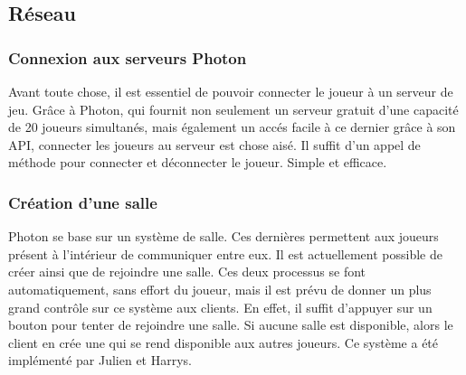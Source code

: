 \subsection{Réseau}

    \subsubsection{Connexion aux serveurs Photon}
        Avant toute chose, il est essentiel de pouvoir connecter le joueur à un serveur de jeu. Grâce à Photon, qui fournit non seulement un serveur gratuit d'une capacité de 20 joueurs simultanés, mais également un accés facile à ce dernier grâce à son API, connecter les joueurs au serveur est chose aisé. Il suffit d'un appel de méthode pour connecter et déconnecter le joueur. Simple et efficace.

    \subsubsection{Création d'une salle}
        Photon se base sur un système de salle. Ces dernières permettent aux joueurs présent à l'intérieur de communiquer entre eux. Il est actuellement possible de créer ainsi que de rejoindre une salle. Ces deux processus se font automatiquement, sans effort du joueur, mais il est prévu de donner un plus grand contrôle sur ce système aux clients. En effet, il suffit d'appuyer sur un bouton pour tenter de rejoindre une salle. Si aucune salle est disponible, alors le client en crée une qui se rend disponible aux autres joueurs. Ce système a été implémenté par Julien et Harrys.
